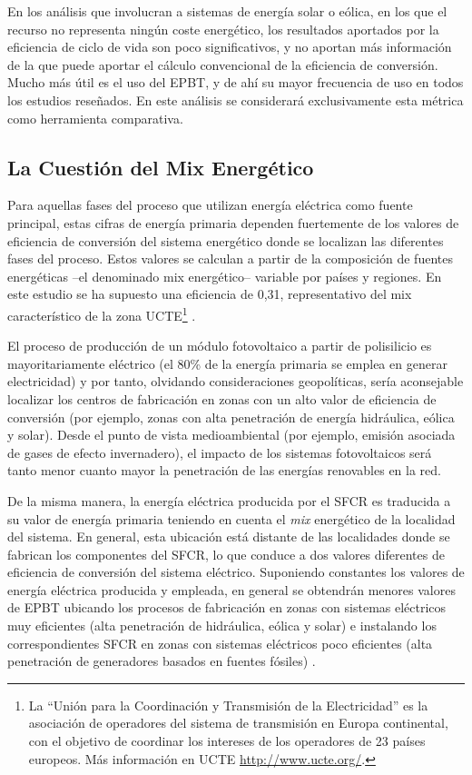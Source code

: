En los análisis que involucran a sistemas de energía solar o eólica,
en los que el recurso no representa ningún coste energético, los
resultados aportados por la eficiencia de ciclo de vida son poco
significativos, y no aportan más información de la que puede aportar
el cálculo convencional de la eficiencia de conversión. Mucho más útil
es el uso del EPBT, y de ahí su mayor frecuencia de uso en todos los
estudios reseñados.  En este análisis se considerará exclusivamente
esta métrica como herramienta comparativa.


\subsection{La Cuestión del Mix Energético}

Para aquellas fases del proceso que utilizan energía eléctrica como
fuente principal, estas cifras de energía primaria dependen
fuertemente de los valores de eficiencia de conversión del sistema
energético donde se localizan las diferentes fases del proceso. Estos
valores se calculan a partir de la composición de fuentes energéticas
--el denominado mix energético-- variable por países y regiones. En
este estudio se ha supuesto una eficiencia de 0,31, representativo del
mix característico de la zona UCTE\footnote{La ``Unión para la
  Coordinación y Transmisión de la Electricidad'' es la asociación de
  operadores del sistema de transmisión en Europa continental, con el
  objetivo de coordinar los intereses de los operadores de 23 países
  europeos. Más información en UCTE \url{http://www.ucte.org/}.%
} \cite{Alsema.Wild-Scholten2006}.

El proceso de producción de un módulo fotovoltaico a partir de
polisilicio es mayoritariamente eléctrico (el 80\% de la energía
primaria se emplea en generar electricidad) y por tanto, olvidando
consideraciones geopolíticas, sería aconsejable localizar los centros
de fabricación en zonas con un alto valor de eficiencia de conversión
(por ejemplo, zonas con alta penetración de energía hidráulica, eólica
y solar). Desde el punto de vista medioambiental (por ejemplo, emisión
asociada de gases de efecto invernadero), el impacto de los sistemas
fotovoltaicos será tanto menor cuanto mayor la penetración de las
energías renovables en la red. 

De la misma manera, la energía eléctrica producida por el SFCR es
traducida a su valor de energía primaria teniendo en cuenta el
\emph{mix} energético de la localidad del sistema. En general, esta
ubicación está distante de las localidades donde se fabrican los
componentes del SFCR, lo que conduce a dos valores diferentes de
eficiencia de conversión del sistema eléctrico. Suponiendo constantes
los valores de energía eléctrica producida y empleada, en general se
obtendrán menores valores de EPBT ubicando los procesos de fabricación
en zonas con sistemas eléctricos muy eficientes (alta penetración de
hidráulica, eólica y solar) e instalando los correspondientes SFCR en
zonas con sistemas eléctricos poco eficientes (alta penetración de
generadores basados en fuentes fósiles) \cite{Krauter.Ruether2004}.


